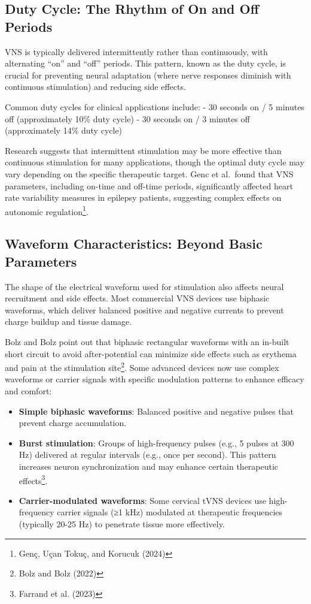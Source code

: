 \documentclass[
  Letterpaper,
]{scrbook}
\providecommand{\tightlist}{%
  \setlength{\itemsep}{0pt}\setlength{\parskip}{0pt}}\usepackage{longtable,booktabs,array}
\begin{document}
\subsection{Duty Cycle: The Rhythm of On and Off
Periods}\label{duty-cycle-the-rhythm-of-on-and-off-periods}

VNS is typically delivered intermittently rather than continuously, with
alternating ``on'' and ``off'' periods. This pattern, known as the duty
cycle, is crucial for preventing neural adaptation (where nerve
responses diminish with continuous stimulation) and reducing side
effects.

Common duty cycles for clinical applications include: - 30 seconds on /
5 minutes off (approximately 10\% duty cycle) - 30 seconds on / 3
minutes off (approximately 14\% duty cycle)

Research suggests that intermittent stimulation may be more effective
than continuous stimulation for many applications, though the optimal
duty cycle may vary depending on the specific therapeutic target. Genc
et al.~found that VNS parameters, including on-time and off-time
periods, significantly affected heart rate variability measures in
epilepsy patients, suggesting complex effects on autonomic
regulation\footnote{Genç, Uçan Tokuç, and Korucuk (2024)}.

\subsection{Waveform Characteristics: Beyond Basic
Parameters}\label{waveform-characteristics-beyond-basic-parameters}

The shape of the electrical waveform used for stimulation also affects
neural recruitment and side effects. Most commercial VNS devices use
biphasic waveforms, which deliver balanced positive and negative
currents to prevent charge buildup and tissue damage.

Bolz and Bolz point out that biphasic rectangular waveforms with an
in-built short circuit to avoid after-potential can minimize side
effects such as erythema and pain at the stimulation site\footnote{Bolz
  and Bolz (2022)}. Some advanced devices now use complex waveforms or
carrier signals with specific modulation patterns to enhance efficacy
and comfort:

\begin{itemize}
\tightlist
\item
  \textbf{Simple biphasic waveforms}: Balanced positive and negative
  pulses that prevent charge accumulation.
\item
  \textbf{Burst stimulation}: Groups of high-frequency pulses (e.g., 5
  pulses at 300 Hz) delivered at regular intervals (e.g., once per
  second). This pattern increases neuron synchronization and may enhance
  certain therapeutic effects\footnote{Farrand et al. (2023)}.
\item
  \textbf{Carrier-modulated waveforms}: Some cervical tVNS devices use
  high-frequency carrier signals (≥1 kHz) modulated at therapeutic
  frequencies (typically 20-25 Hz) to penetrate tissue more effectively.
\end{itemize}
\end{document}
